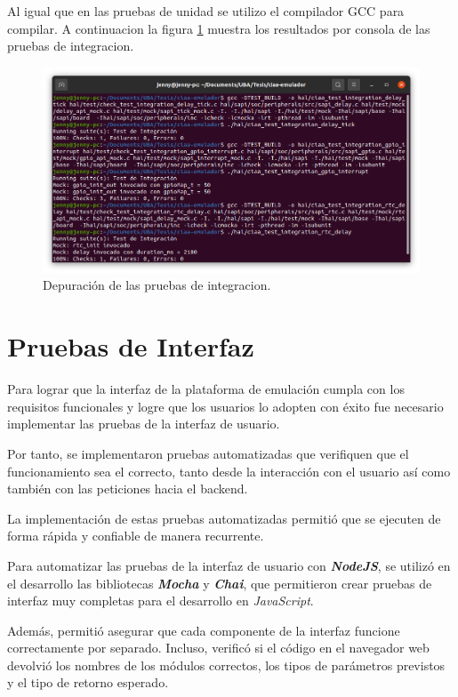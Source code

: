 Al igual que en las pruebas de unidad se utilizo el compilador GCC para compilar. A continuacion la figura \ref{fig:PruebasIntegracion} muestra los resultados por consola de las pruebas de integracion.

\begin{figure}[ht]
	\centering
	\includegraphics[scale=.35]{./Figures/PruebasIntegracion.png}
	\caption{Depuración de las pruebas de integracion.}
	\label{fig:PruebasIntegracion}
\end{figure}

\section{Pruebas de Interfaz}
\label{sec:Pruebas de Interfaz}

Para lograr que la interfaz de la plataforma de emulación cumpla con los requisitos funcionales y logre que los usuarios lo adopten con éxito fue necesario implementar las pruebas de la interfaz de usuario.

Por tanto, se implementaron pruebas automatizadas que verifiquen que el funcionamiento sea el correcto, tanto desde la interacción con el usuario así como también con las peticiones hacia el backend.

La implementación de estas pruebas automatizadas permitió que se  ejecuten de forma rápida y confiable de manera recurrente. 

Para automatizar las pruebas de la interfaz de usuario con \textit{\textbf{NodeJS}}, se utilizó en el desarrollo las bibliotecas \textit{\textbf{Mocha}} y \textit{\textbf{Chai}}, que permitieron crear pruebas de interfaz muy completas para el desarrollo en \textit{JavaScript}.

Además, permitió asegurar que cada componente de la interfaz funcione correctamente por separado. Incluso, verificó si el código en el navegador web devolvió los nombres de los módulos correctos, los tipos de parámetros previstos y el tipo de retorno esperado.

